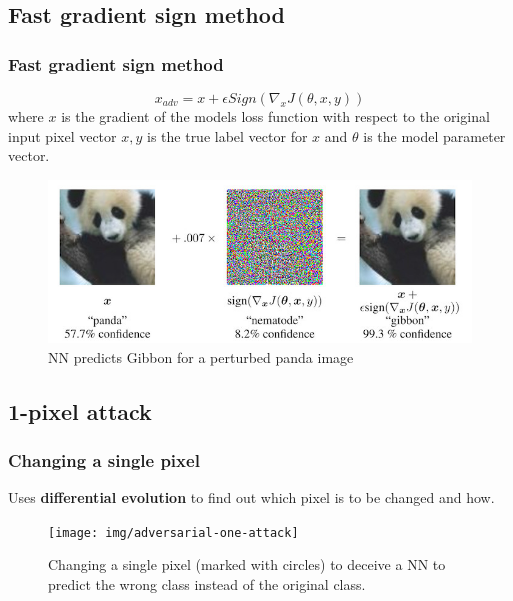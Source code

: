 \documentclass[12pt]{beamer}
\begin{document}
\subsection{Fast gradient sign method}
\begin{frame}
\frametitle{Fast gradient sign method}
$$x_{adv} = x + \epsilon Sign(\nabla_xJ(\theta,x,y))$$
where $x$ is the gradient of the models loss function with respect to the original input pixel vector $x, y$ is the true label vector for $x$ and $\theta$ is the model parameter vector.
\begin{figure}
	\centering
	\includegraphics[width=0.93\linewidth, height=0.43\textheight]{img/adversarial-panda}
	\caption{NN predicts Gibbon for a perturbed panda image\protect\footnotemark}
	\label{fig:adversarial-panda}
\end{figure}
\end{frame}

\subsection{1-pixel attack}
\begin{frame}
\frametitle{Changing a single pixel}
Uses \textbf{differential evolution} to find out which pixel is to be changed and how.

\begin{figure}
	\centering
	\texttt{[image: img/adversarial-one-attack]}
	\caption{Changing a single pixel (marked with circles) to deceive a NN to predict the wrong class instead of the original class.\protect\footnotemark}
	\label{fig:adversarial-1pixel}
\end{figure}


\end{frame}
\end{document}
